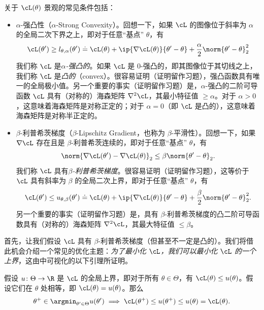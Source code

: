 \documentclass[../../book-main_zh.tex]{subfiles}
\begin{document}
关于 \(\cL(\theta)\) 景观的常见条件包括：
\begin{itemize}
    \item \(\alpha\)-强凸性（\(\alpha\)-Strong Convexity）。回想一下，如果 \(\cL\) 的图像位于斜率为 \(\alpha\) 的全局二次下界之上，即对于任意“基点” \(\theta\)，有
        \begin{equation}
            \cL(\theta^{\prime}) \geq l_{\theta,
            \alpha}(\theta^{\prime}) \doteq \cL(\theta) + \ip{\nabla
            \cL(\theta)}{\theta^{\prime} - \theta} +
            \frac{\alpha}{2}\norm{\theta^{\prime} - \theta}_{2}^{2}
        \end{equation}
        我们称 \(\cL\) 是\textit{\(\alpha\)-强凸的}。如果 \(\cL\) 是 \(0\)-强凸的，即其图像位于其切线之上，我们称 \(\cL\) 是\textit{凸的}（convex）。很容易证明（证明留作习题），强凸函数具有唯一的全局极小值。另一个重要的事实（证明留作习题）是，\(\alpha\)-强凸的二阶可导函数 \(\cL\) 具有（对称的）海森矩阵 \(\nabla^{2}\cL\)，其最小特征值 \(\geq \alpha\)。对于 \(\alpha > 0\)，这意味着海森矩阵是对称正定的；对于 \(\alpha = 0\)（即 \(\cL\) 是凸的），这意味着海森矩阵是对称半正定的。
    \item \(\beta\)-利普希茨梯度（\(\beta\)-Lipschitz Gradient，也称为 \(\beta\)-平滑性）。回想一下，如果 \(\nabla \cL\) 存在且是 \(\beta\)-利普希茨连续的，即对于任意“基点” \(\theta\)，有
        \begin{equation}
            \norm{\nabla \cL(\theta^{\prime}) - \nabla
            \cL(\theta)}_{2} \leq \beta \norm{\theta^{\prime} - \theta}_{2}.
        \end{equation}
        我们称 \(\cL\) 具有\textit{\(\beta\)-利普希茨梯度}。很容易证明（证明留作习题），这等价于 \(\cL\) 具有斜率为 \(\beta\) 的全局二次上界，即对于任意“基点” \(\theta\)，有
        \begin{equation}
            \cL(\theta^{\prime}) \leq u_{\theta,
            \beta}(\theta^{\prime}) \doteq \cL(\theta) + \ip{\nabla
            \cL(\theta)}{\theta^{\prime} - \theta} +
            \frac{\beta}{2}\norm{\theta^{\prime} - \theta}_{2}^{2}.
        \end{equation}
        另一个重要的事实（证明留作习题）是，具有 \(\beta\)-利普希茨梯度的凸二阶可导函数具有（对称的）海森矩阵 \(\nabla^{2}\cL\)，其最大特征值 \(\leq \beta\)。
\end{itemize}
首先，让我们假设 \(\cL\) 具有 \(\beta\)-利普希茨梯度（但甚至不一定是凸的）。我们将借此机会介绍一个常见的优化主题：\textit{为了最小化 \(\cL\)，我们可以最小化 \(\cL\) 的一个上界}，这由中可视化的以下引理所证明。
\begin{lemma}[主化-最小化]\label{lem:majorization_minimization}
    假设 \(u \colon \Theta \to \R\) 是 \(\cL\) 的全局上界，即对于所有 \(\theta \in \Theta\)，有 \(\cL(\theta) \leq u(\theta)\)。假设它们在 \(\theta\) 处相等，即 \(\cL(\theta) = u(\theta)\)。那么
    \begin{equation}
        \theta^{+} \in \argmin_{\theta^{\prime} \in
        \Theta}u(\theta^{\prime}) \implies \cL(\theta^{+}) \leq
        u(\theta^{+}) \leq u(\theta) = \cL(\theta).
    \end{equation}
\end{lemma}
\end{document}
